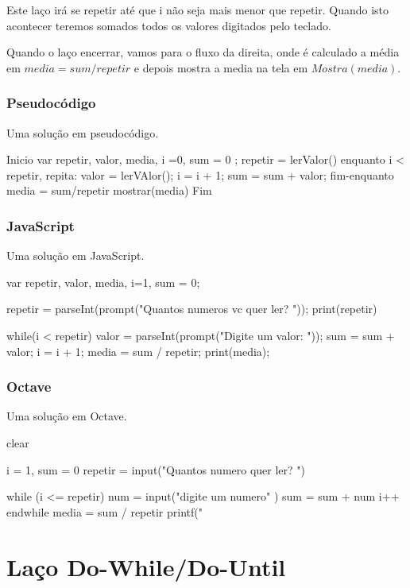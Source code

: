 Este laço irá se repetir até que i não seja mais menor que repetir. Quando isto acontecer teremos somados todos os valores digitados pelo teclado.

Quando o laço encerrar, vamos para o fluxo da direita, onde é calculado a média em $media=sum/repetir$ e depois mostra a media na tela em $Mostra(media)$.

\subsubsection*{Pseudocódigo}
Uma solução em pseudocódigo.
\begin{pseudocode}
Inicio
var repetir, valor, media, i =0, sum = 0 ;
repetir = lerValor()
enquanto i < repetir, repita:
  valor = lerVAlor();
  i = i + 1;
sum = sum + valor;
fim-enquanto
media = sum/repetir
mostrar(media)
Fim
\end{pseudocode}

\subsubsection*{JavaScript}
Uma solução em JavaScript.
\begin{code}
var repetir, valor, media, i=1, sum = 0;

repetir = parseInt(prompt("Quantos numeros vc quer ler? "));
print(repetir)

while(i < repetir){
  valor = parseInt(prompt("Digite um valor: "));
  sum = sum + valor;
  i = i + 1;
}
media = sum / repetir;
print(media);
\end{code}

\subsubsection*{Octave}
Uma solução em Octave.
\begin{code}
clear

i = 1, sum = 0
repetir = input("Quantos numero quer ler? ")

while (i <= repetir)
  num = input("digite um numero" )
  sum = sum + num
  i++
endwhile
media = sum / repetir
printf(" %
\end{code}


\section{Laço Do-While/Do-Until}
\label{sec:dowhile}

